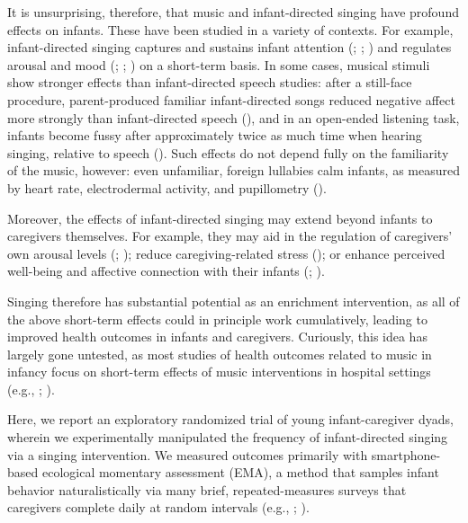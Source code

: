 \documentclass[
]{article}
\begin{document}
It is unsurprising, therefore, that music and infant-directed singing
have profound effects on infants. These have been studied in a variety
of contexts. For example, infant-directed singing captures and sustains
infant attention (; ;
) and regulates arousal
and mood (;
;
) on a short-term
basis. In some cases, musical stimuli show stronger effects than
infant-directed speech studies: after a still-face procedure,
parent-produced familiar infant-directed songs reduced negative affect
more strongly than infant-directed speech
(), and in an
open-ended listening task, infants become fussy after approximately
twice as much time when hearing singing, relative to speech
(). Such effects do not
depend fully on the familiarity of the music, however: even unfamiliar,
foreign lullabies calm infants, as measured by heart rate, electrodermal
activity, and pupillometry ().

Moreover, the effects of infant-directed singing may extend beyond
infants to caregivers themselves. For example, they may aid in the
regulation of caregivers' own arousal levels
(;
); reduce
caregiving-related stress ();
or enhance perceived well-being and affective connection with their
infants (;
).

Singing therefore has substantial potential as an enrichment
intervention, as all of the above short-term effects could in principle
work cumulatively, leading to improved health outcomes in infants and
caregivers. Curiously, this idea has largely gone untested, as most
studies of health outcomes related to music in infancy focus on
short-term effects of music interventions in hospital settings (e.g.,
;
).

Here, we report an exploratory randomized trial of young
infant-caregiver dyads, wherein we experimentally manipulated the
frequency of infant-directed singing via a singing intervention. We
measured outcomes primarily with smartphone-based ecological momentary
assessment (EMA), a method that samples infant behavior naturalistically
via many brief, repeated-measures surveys that caregivers complete daily
at random intervals (e.g., ; ).
\end{document}
